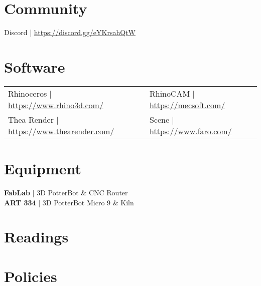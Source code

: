 \documentclass[11pt,article,oneside]{memoir}
\begin{document}
\section{Community}
Discord | \url{https://discord.gg/eYKrsahQtW}

\section{Software}
\begin{table}[H]
\begin{tabular}{@{}l l}
Rhinoceros | \url{https://www.rhino3d.com/} &
RhinoCAM  | \url{https://mecsoft.com/}\\
Thea Render | \url{https://www.thearender.com/} &
Scene | \url{https://www.faro.com/} \\

\end{tabular}
\end{table}

\section{Equipment}
\textbf{FabLab} | 3D PotterBot \& CNC Router\\
\textbf{ART 334} | 3D PotterBot Micro 9 \& Kiln

\section{Readings}
\vspace*{0.5cm}
\nocite{*}
\setlength{}
\printbibliography[heading=none]


\section{Policies}
\end{document}

